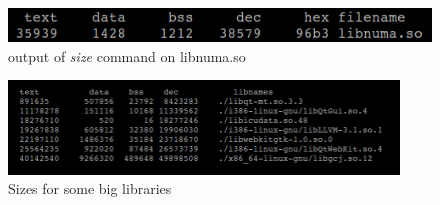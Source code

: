 \begin{figure}
    \centering
    \includegraphics[width=\linewidth]{sizeOutput.png}
    \caption{output of \textit{size} command on libnuma.so}
    \label{fig:sizeOutput}
\end{figure}

\begin{figure}
    \centering
    \includegraphics[width=\linewidth, height=2.5cm]{libSizes.png}
    \caption{Sizes for some big libraries}
    \label{fig:libSizes}
\end{figure}
